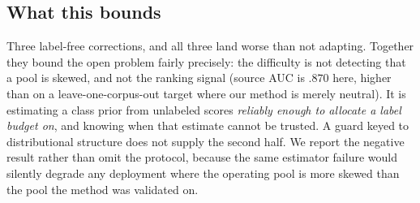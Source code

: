 \documentclass[conference]{IEEEtran}
\begin{document}
\subsection{What this bounds}
Three label-free corrections, and all three land worse than not adapting.
Together they bound the open problem fairly precisely: the difficulty is not
detecting that a pool is skewed, and not the ranking signal (source AUC is
$.870$ here, higher than on a leave-one-corpus-out target where our method is
merely neutral). It is estimating a class prior from unlabeled scores
\emph{reliably enough to allocate a label budget on}, and knowing when that
estimate cannot be trusted. A guard keyed to distributional structure does not
supply the second half. We report the negative result rather than omit the
protocol, because the same estimator failure would silently degrade any
deployment where the operating pool is more skewed than the pool the method was
validated on.
\end{document}
